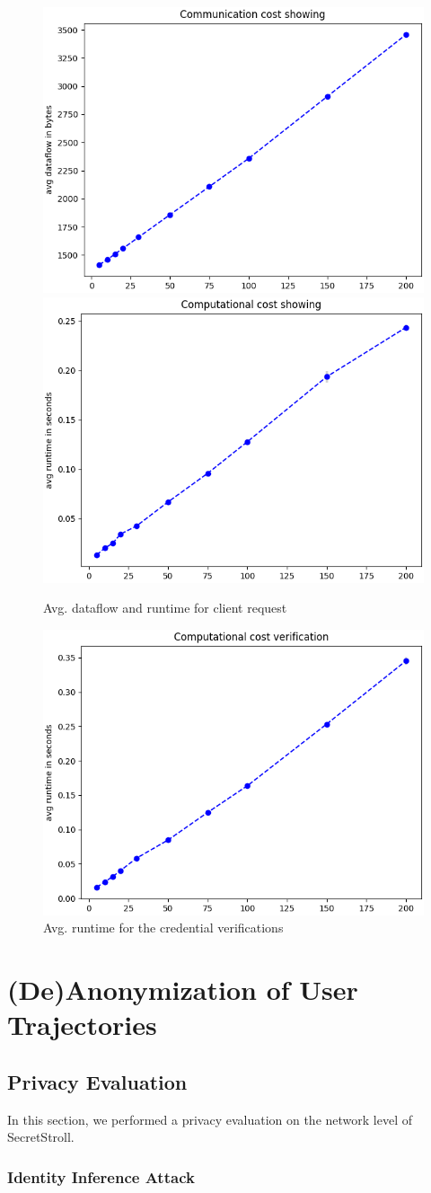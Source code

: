 \documentclass[10pt,conference,compsocconf]{IEEEtran}
\begin{document}
\begin{figure}[h!]
    \includegraphics[width=0.4\linewidth]{dataflow_showing.png}
    \includegraphics[width=0.4\linewidth]{runtime_showing.png}
    \caption{Avg. dataflow and runtime for client request}
    \label{fig:showing}
\end{figure}

\begin{figure}[h!]
    \includegraphics[width=0.4\linewidth]{runtime_verification}
    \caption{Avg. runtime for the credential verifications}
    \label{fig:verify}
\end{figure}


\section{(De)Anonymization of User Trajectories}

\subsection{Privacy Evaluation}
In this section, we performed a privacy evaluation on the network level of
SecretStroll.


\subsubsection{Identity Inference Attack}
\end{document}
